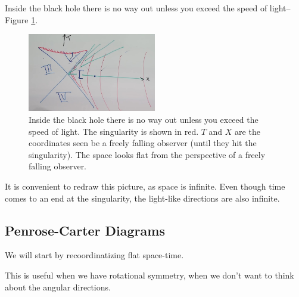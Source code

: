 \documentclass[]{article}
\begin{document}
{Inside the black hole there is no way out unless you exceed the speed of light--Figure \ref{fig:gr-8-quadrant1}.

\begin{figure}[H]
	\begin{center}
		\caption[Inside the black hole ]{Inside the black hole there is no way out unless you exceed the speed of light. The singularity is shown in red. $T$ and $X$ are the coordinates seen be a freely falling observer (until they hit the singularity). The space looks flat from the perspective of a freely falling observer.}\label{fig:gr-8-quadrant1}
		\includegraphics[width=0.5\textwidth]{gr-8-quadrant1}
	\end{center}
\end{figure}

It is convenient to redraw this picture, as space is infinite. Even though time comes to an end at the singularity, the light-like directions are also infinite.

\subsection{Penrose-Carter Diagrams}

We will start by recoordinatizing flat space-time.

This is useful when we have rotational symmetry, when we don't want to think about the angular directions.

}
\end{document}
